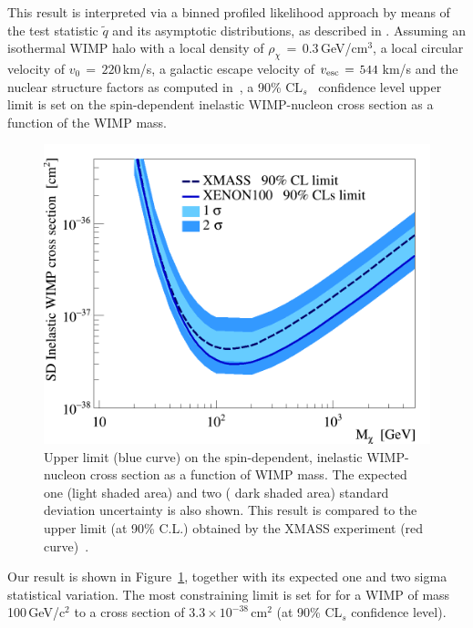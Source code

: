 This result is interpreted via a binned profiled likelihood approach by means of the test statistic $\tilde{q}$
and its asymptotic distributions, as  described in \cite{asympt}. 
Assuming  an isothermal WIMP halo with a local density of $\rho_{\chi} \, = \, 0.3$\,GeV/cm$^3$, a local circular velocity of $v_0 \,= \, 220$\,km/s, 
a galactic escape velocity of $v_{\rm{esc}} \, = \, 544$\,km/s 
and the nuclear structure factors as computed in~\cite{Baudis:2013qla}, 
a 90\% CL$_s$~\cite{cls} confidence level upper limit is set on the spin-dependent inelastic WIMP-nucleon cross section as a function of the WIMP mass. 

\begin{figure}[th]
  \includegraphics[width=\linewidth]{images/limit_reb.png}
  \caption{Upper limit (blue curve) on the spin-dependent, inelastic WIMP-nucleon cross section as a function of WIMP mass.  
	  The expected one (light shaded area) and two ( dark shaded area) standard deviation uncertainty is also shown. 
	  This result is compared to the upper limit (at 90\% C.L.) obtained by the XMASS experiment (red curve)~\cite{Uchida:2014cnn}.}
  \label{fig:limits}
\end{figure}


Our result is shown in Figure~\ref{fig:limits}, together with its expected one and two sigma statistical variation.
The most constraining limit is  set for for a WIMP of mass 100\,GeV/c$^2$ to a cross section of $3.3 \times 10^{-38}$\,cm$^{2}$ (at 90\% CL$_s$ confidence level). 

